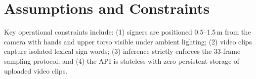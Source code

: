 \section{Assumptions and Constraints}
\label{sec:assumptions}
Key operational constraints include: (1) signers are positioned 0.5--1.5\,m from the camera with hands and upper torso visible under ambient lighting; (2) video clips capture isolated lexical sign words; (3) inference strictly enforces the 33-frame sampling protocol; and (4) the API is stateless with zero persistent storage of uploaded video clips.
